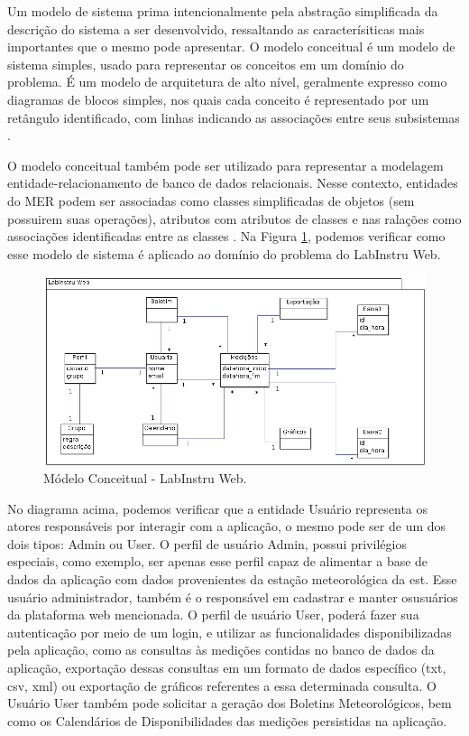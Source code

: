 Um modelo de sistema prima intencionalmente pela abstração simplificada da descrição do sistema a ser desenvolvido, ressaltando as caracterísiticas mais importantes que o mesmo pode apresentar. O modelo conceitual é um modelo de sistema simples, usado para representar os conceitos em um domínio do problema. É um modelo de arquitetura de alto nível, geralmente expresso como diagramas de blocos simples, nos quais cada conceito é representado por um retângulo identificado, com linhas indicando as associações entre seus subsistemas \cite{Sommerville:Livro}.

O modelo conceitual também pode ser utilizado para representar a modelagem entidade-relacionamento de banco de dados relacionais. Nesse contexto, entidades do MER podem ser associadas como classes simplificadas de objetos (sem possuirem suas operações), atributos com atributos de classes e nas ralações como associações identificadas entre as classes \cite{Sommerville:Livro}. Na Figura \ref{fig:modeloConceitual}, podemos verificar como esse modelo de sistema é aplicado ao domínio do problema do LabInstru Web.

\begin{figure}[H]
	\centering
	\includegraphics[scale=0.8]{img/ModeloConceitual.png}
	\caption{Módelo Conceitual - LabInstru Web.}
	\label{fig:modeloConceitual}
\end{figure}

No diagrama acima, podemos verificar que a entidade Usuário representa os atores responsáveis por interagir com a aplicação, o mesmo pode ser de um dos dois tipos: Admin ou User. O perfil de usuário Admin, possui privilégios especiais, como exemplo, ser apenas esse perfil capaz de alimentar a base de dados da aplicação com dados provenientes da estação meteorológica da est. Esse usuário administrador, também é o responsável em cadastrar e manter osusuários da plataforma web mencionada. O perfil de usuário User, poderá fazer sua autenticação por meio de um login, e utilizar as funcionalidades disponibilizadas pela aplicação, como as consultas às medições contidas no banco de dados da aplicação, exportação dessas consultas em um formato de dados específico (txt, csv, xml) ou exportação de gráficos referentes a essa determinada consulta. O Usuário User também pode solicitar a geração dos Boletins Meteorológicos, bem como os Calendários de Disponibilidades das medições persistidas na aplicação.

